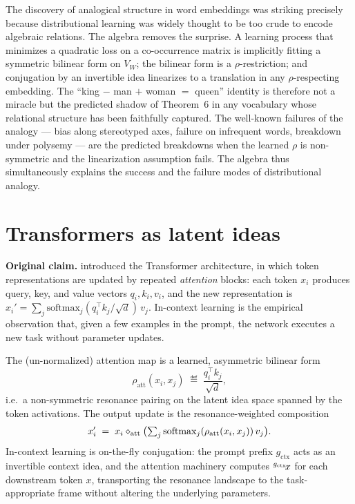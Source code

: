 \litcomment The discovery of analogical structure in word embeddings
\citep{MikolovKingQueen2013} was striking precisely because
distributional learning was widely thought to be too crude to encode
algebraic relations. The algebra removes the surprise. A learning
process that minimizes a quadratic loss on a co-occurrence matrix is
implicitly fitting a symmetric bilinear form on $V_W$; the bilinear
form is a $\rho$-restriction; and conjugation by an invertible idea
linearizes to a translation in any $\rho$-respecting embedding. The
``king $-$ man $+$ woman $=$ queen'' identity is therefore not a
miracle but the predicted shadow of Theorem~6 in any vocabulary whose
relational structure has been faithfully captured. The well-known
failures of the analogy --- bias along stereotyped axes, failure on
infrequent words, breakdown under polysemy --- are the predicted
breakdowns when the learned $\rho$ is non-symmetric and the
linearization assumption fails. The algebra thus simultaneously
explains the success and the failure modes of distributional analogy.

\section{Transformers as latent ideas}\label{sec:cogsci-transformers}

\textbf{Original claim.} \citet{Vaswani2017} introduced the Transformer
architecture, in which token representations are updated by repeated
\emph{attention} blocks: each token $x_i$ produces query, key, and value
vectors $q_i,k_i,v_i$, and the new representation is
$x_i'=\sum_j \mathrm{softmax}_j(q_i^\top k_j/\sqrt{d})\,v_j$. In-context
learning \citep{BrownGPT3} is the empirical observation that, given a few
examples in the prompt, the network executes a new task without parameter
updates.

\formalclaim The (un-normalized) attention map is a learned, asymmetric
bilinear form
\[
  \rho_{\mathrm{att}}(x_i,x_j)\;\eqdef\;\frac{q_i^\top k_j}{\sqrt{d}},
\]
i.e.\ a non-symmetric resonance pairing on the latent idea space spanned by
the token activations. The output update is the resonance-weighted
composition
\[
  x_i' \;=\; x_i\mathbin{\diamond}_{\mathrm{att}}\bigl(\textstyle\sum_j
  \mathrm{softmax}_j(\rho_{\mathrm{att}}(x_i,x_j))\,v_j\bigr).
\]
In-context learning is on-the-fly conjugation: the prompt prefix
$g_{\mathrm{ctx}}$ acts as an invertible context idea, and the attention
machinery computes ${}^{g_{\mathrm{ctx}}}\!x$ for each downstream token
$x$, transporting the resonance landscape to the task-appropriate frame
without altering the underlying parameters.

